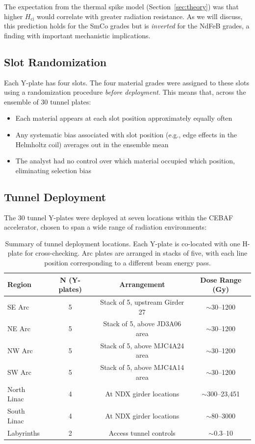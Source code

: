\documentclass[11pt,letterpaper]{article}
\newcommand{\ndfeb}{NdFeB}
\newcommand{\smco}{SmCo}
\newcommand{\Hci}{H_\mathrm{ci}}
\newcommand{\CEBAF}{CEBAF}
\begin{document}
The expectation from the thermal spike model (Section~\ref{sec:theory}) was
that higher $\Hci$ would correlate with greater radiation resistance. As we
will discuss, this prediction holds for the \smco{} grades but is
\emph{inverted} for the \ndfeb{} grades, a finding with important
mechanistic implications.

\subsection{Slot Randomization}

Each Y-plate has four slots. The four material grades were assigned to these
slots using a randomization procedure \emph{before deployment}. This means
that, across the ensemble of 30 tunnel plates:
\begin{itemize}
    \item Each material appears at each slot position approximately equally
    often
    \item Any systematic bias associated with slot position (e.g., edge effects
    in the Helmholtz coil) averages out in the ensemble mean
    \item The analyst had no control over which material occupied which position,
    eliminating selection bias
\end{itemize}

\subsection{Tunnel Deployment}
\label{sec:deployment}

The 30 tunnel Y-plates were deployed at seven locations within the \CEBAF
accelerator, chosen to span a wide range of radiation environments:

\begin{table}[H]
\centering
\caption{Summary of tunnel deployment locations. Each Y-plate is co-located
with one H-plate for cross-checking. Arc plates are arranged in stacks of five,
with each line position corresponding to a different beam energy pass.}
\label{tab:deployment}
\begin{tabular}{@{}lccc@{}}
\toprule
\textbf{Region} & \textbf{N (Y-plates)} & \textbf{Arrangement} & \textbf{Dose Range (Gy)} \\
\midrule
SE Arc    & 5 & Stack of 5, upstream Girder 27 & $\sim$30--1200 \\
NE Arc    & 5 & Stack of 5, above JD3A06 area & $\sim$30--1200 \\
NW Arc    & 5 & Stack of 5, above MJC4A24 area & $\sim$30--1200 \\
SW Arc    & 5 & Stack of 5, above MJC4A14 area & $\sim$30--1200 \\
North Linac & 4 & At NDX girder locations & $\sim$300--23,451 \\
South Linac & 4 & At NDX girder locations & $\sim$80--3000 \\
Labyrinths  & 2 & Access tunnel controls & $\sim$0.3--10 \\
\bottomrule
\end{tabular}
\end{table}
\end{document}
